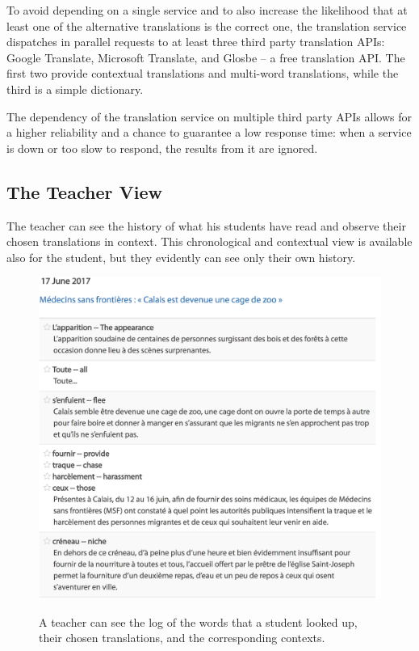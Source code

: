 To avoid depending on a single service and to also increase the likelihood that at least one of the alternative translations is the correct one, the translation service dispatches in parallel requests to at least three third party translation APIs: Google Translate, Microsoft Translate, and Glosbe -- a free translation API. The first two provide contextual translations and multi-word translations, while the third is a simple dictionary. 

The dependency of the translation service on multiple third party APIs allows for a higher reliability and a chance to guarantee a low response time: when a service is down or too slow to respond, the results from it are ignored.

\subsection{The Teacher View}

The teacher can see the history of what his students have read and observe their chosen translations in context. This chronological and contextual view is available also for the student, but they evidently can see only their own history.

\begin{figure}[h!]
\centering
  \includegraphics[width=0.95\columnwidth]{figures/teacher_dashboard.png}
  \caption{A teacher can see the log of the words that a student looked up, their chosen translations, and the corresponding contexts.}{
  \label{exercise_translate}
  }
\end{figure}





